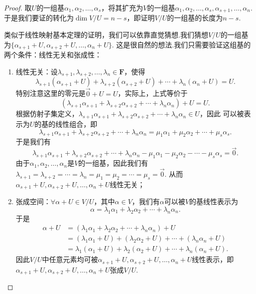 \begin{proof}
    取$U$的一组基$\alpha_1,\alpha_2,\ldots,\alpha_s$，将其扩充为$V$的一组基$\alpha_1,\alpha_2,\ldots,\alpha_s,\alpha_{s+1},\ldots,\alpha_n$.
    于是我们要证的转化为$\dim V/U=n-s$，即证明$V/U$的一组基的长度为$n-s$.

    类似于线性映射基本定理的证明，我们可以依靠直觉猜想.我们猜想$V/U$的一组基为$\{\alpha_{s+1}+U,\alpha_{s+2}+U,\ldots,\alpha_n+U\}$.
    这是很自然的想法.我们只需要验证这组基的两个条件：线性无关和张成性：
    \begin{enumerate}
        \item 线性无关：设$\lambda_{s+1},\lambda_{s+2},\ldots,\lambda_n\in\mathbf{F}$，使得
        \[\lambda_{s+1}(\alpha_{s+1}+U)+\lambda_{s+2}(\alpha_{s+2}+U)+\cdots+\lambda_n(\alpha_n+U)=U.\]
        特别注意这里的零元是$\vec{0}+U=U$，实际上，上式等价于
        \[(\lambda_{s+1}\alpha_{s+1}+\lambda_{s+2}\alpha_{s+2}+\cdots+\lambda_n\alpha_n)+U=U.\]
        根据仿射子集定义，$\lambda_{s+1}\alpha_{s+1}+\lambda_{s+2}\alpha_{s+2}+\cdots+\lambda_n\alpha_n\in U$，因此
        可以被表示为$U$的基的线性组合，即
        \[\lambda_{s+1}\alpha_{s+1}+\lambda_{s+2}\alpha_{s+2}+\cdots+\lambda_n\alpha_n=\mu_1\alpha_1+\mu_2\alpha_2+\cdots+\mu_s\alpha_s.\]
        于是我们有
        \[\lambda_{s+1}\alpha_{s+1}+\lambda_{s+2}\alpha_{s+2}+\cdots+\lambda_n\alpha_n-\mu_1\alpha_1-\mu_2\alpha_2-\cdots-\mu_s\alpha_s=\vec{0}.\]
        由于$\alpha_1,\alpha_2,\ldots,\alpha_n$是$V$的一组基，因此我们有
        $\lambda_{s+1}=\lambda_{s+2}=\cdots=\lambda_n=\mu_1=\mu_2=\cdots=\mu_s=\vec{0}$.
        从而$\alpha_{s+1}+U,\alpha_{s+2}+U,\ldots,\alpha_n+U$线性无关；

        \item 张成空间：$\forall\alpha+U\in V/U$，其中$\alpha\in V$，我们有$\alpha$可以被$V$的基线性表示为
        \[\alpha=\lambda_1\alpha_1+\lambda_2\alpha_2+\cdots+\lambda_n\alpha_n.\]
        于是
        \begin{align*}
            \alpha+U&=(\lambda_1\alpha_1+\lambda_2\alpha_2+\cdots+\lambda_n\alpha_n)+U\\
            &=(\lambda_1\alpha_1+U)+(\lambda_2\alpha_2+U)+\cdots+(\lambda_n\alpha_n+U)\\
            &=\lambda_1(\alpha_1+U)+\lambda_2(\alpha_2+U)+\cdots+\lambda_n(\alpha_n+U).
        \end{align*}
        因此$V/U$中任意元素均可被$\alpha_{s+1}+U,\alpha_{s+2}+U,\ldots,\alpha_n+U$线性表示，即$\alpha_{s+1}+U,\alpha_{s+2}+U,\ldots,\alpha_n+U$张成$V/U$.
    \end{enumerate}
\end{proof}

